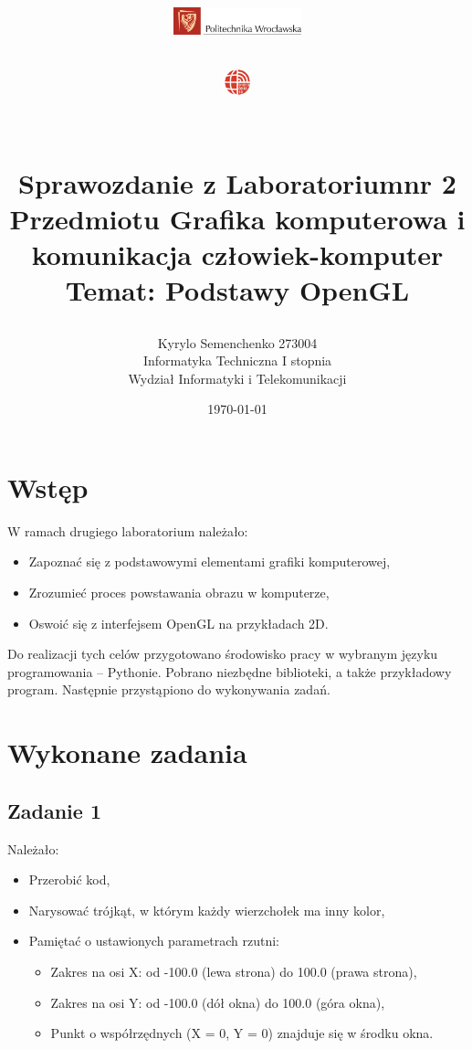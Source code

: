 \documentclass[a4paper, 12pt]{article}
\title{
    \begin{minipage}{0.4\textwidth}
        \includegraphics[height=30px]{logoPWR.png} %
    \end{minipage}
    \hfill
    \begin{minipage}{0.4\textwidth}
        \raggedleft
        \includegraphics[height=30px]{image.png} %
    \end{minipage}
    \vspace{2cm} %
    \\
    Sprawozdanie z Laboratoriumnr 2\\ 
    \large Przedmiotu  Grafika komputerowa
    i komunikacja człowiek-komputer\\ 
    \small Temat: Podstawy OpenGL\\
}
\author{Kyrylo Semenchenko 273004 \\
Informatyka Techniczna I stopnia \\
Wydział Informatyki i Telekomunikacji}
\date{\today}
\begin{document}
\maketitle

\tableofcontents

\newpage

\section{Wstęp}

W ramach drugiego laboratorium należało:
\begin{itemize}
    \item Zapoznać się z podstawowymi elementami grafiki komputerowej,
    \item Zrozumieć proces powstawania obrazu w komputerze,
    \item Oswoić się z interfejsem OpenGL na przykładach 2D.
\end{itemize}

Do realizacji tych celów przygotowano środowisko pracy w wybranym języku programowania -- Pythonie. Pobrano niezbędne biblioteki, a także przykładowy program. Następnie przystąpiono do wykonywania zadań.

\section{Wykonane zadania}

\subsection{Zadanie 1}

Należało:
\begin{itemize}
    \item Przerobić kod,
    \item Narysować trójkąt, w którym każdy wierzchołek ma inny kolor,
    \item Pamiętać o ustawionych parametrach rzutni:
    \begin{itemize}
        \item Zakres na osi X: od -100.0 (lewa strona) do 100.0 (prawa strona),
        \item Zakres na osi Y: od -100.0 (dół okna) do 100.0 (góra okna),
        \item Punkt o współrzędnych (X = 0, Y = 0) znajduje się w środku okna.
    \end{itemize}
\end{itemize}
\end{document}
